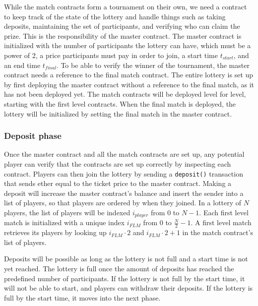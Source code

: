 While the match contracts form a tournament on their own, we need a contract to keep track of the state of the lottery and handle things such as taking deposits, maintaining the set of participants, and verifying who can claim the prize. This is the responsibility of the master contract. The master contract is initialized with the number of participants the lottery can have, which must be a power of 2, a price participants must pay in order to join, a start time $t_{start}$, and an end time $t_{final}$. To be able to verify the winner of the tournament, the master contract needs a reference to the final match contract. The entire lottery is set up by first deploying the master contract without a reference to the final match, as it has not been deployed yet. The match contracts will be deployed level for level, starting with the first level contracts. When the final match is deployed, the lottery will be initialized by setting the final match in the master contract. 


\subsubsection{Deposit phase}
Once the master contract and all the match contracts are set up, any potential player can verify that the contracts are set up correctly by inspecting each contract. Players can then join the lottery by sending a \texttt{deposit()} transaction that sends ether equal to the ticket price to the master contract. Making a deposit will increase the master contract's balance and insert the sender into a list of players, so that players are ordered by when they joined. In a lottery of $N$ players, the list of players will be indexed $i_{player}$ from $0$ to $N-1$. Each first level match is initialized with a unique index $i_{FLM}$ from $0$ to $\frac{N}{2}-1$. A first level match retrieves its players by looking up $i_{FLM} \cdot 2$ and $i_{FLM} \cdot 2 + 1$ in the match contract's list of players.

Deposits will be possible as long as the lottery is not full and a start time is not yet reached. The lottery is full once the amount of deposits has reached the predefined number of participants. If the lottery is not full by the start time, it will not be able to start, and players can withdraw their deposits. If the lottery is full by the start time, it moves into the next phase.

